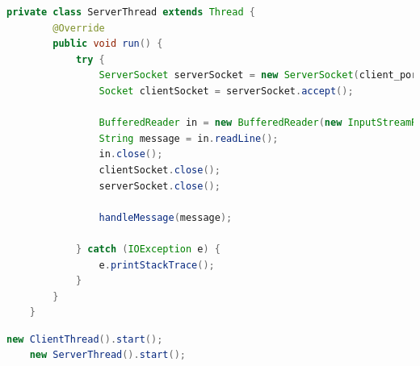 \begin{lstlisting}[language=java,label=t7a,lineskip={0pt}, caption=T7: Client Code, basicstyle=\scriptsize, captionpos=b]
private class ServerThread extends Thread {
        @Override
        public void run() {
            try {
                ServerSocket serverSocket = new ServerSocket(client_port);
                Socket clientSocket = serverSocket.accept();

                BufferedReader in = new BufferedReader(new InputStreamReader(clientSocket.getInputStream()));
                String message = in.readLine();
                in.close();
                clientSocket.close();
                serverSocket.close();

                handleMessage(message);

            } catch (IOException e) {
                e.printStackTrace();
            }
        }
    }
\end{lstlisting}

\begin{lstlisting}[language=java,label=t7c,lineskip={0pt}, caption=T7: Starting Server and Client Threads, basicstyle=\scriptsize, captionpos=b]
    new ClientThread().start();
    new ServerThread().start();
\end{lstlisting}

\newpage



